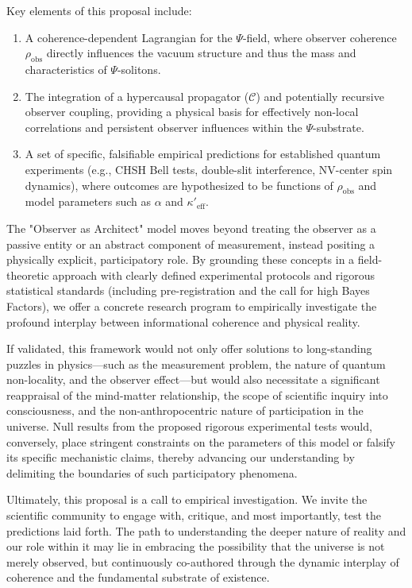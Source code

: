\documentclass[11pt, a4paper]{book}
\begin{document}
Key elements of this proposal include:
\begin{enumerate}
    \item A coherence-dependent Lagrangian for the $\Psi$-field, where observer coherence $\rho_{\text{obs}}$ directly influences the vacuum structure and thus the mass and characteristics of $\Psi$-solitons.
    \item The integration of a hypercausal propagator ($\mathcal{C}$) and potentially recursive observer coupling, providing a physical basis for effectively non-local correlations and persistent observer influences within the $\Psi$-substrate.
    \item A set of specific, falsifiable empirical predictions for established quantum experiments (e.g., CHSH Bell tests, double-slit interference, NV-center spin dynamics), where outcomes are hypothesized to be functions of $\rho_{\text{obs}}$ and model parameters such as $\alpha$ and $\kappa'_{\text{eff}}$.
\end{enumerate}
The "Observer as Architect" model moves beyond treating the observer as a passive entity or an abstract component of measurement, instead positing a physically explicit, participatory role. By grounding these concepts in a field-theoretic approach with clearly defined experimental protocols and rigorous statistical standards (including pre-registration and the call for high Bayes Factors), we offer a concrete research program to empirically investigate the profound interplay between informational coherence and physical reality.

If validated, this framework would not only offer solutions to long-standing puzzles in physics—such as the measurement problem, the nature of quantum non-locality, and the observer effect—but would also necessitate a significant reappraisal of the mind-matter relationship, the scope of scientific inquiry into consciousness, and the non-anthropocentric nature of participation in the universe. Null results from the proposed rigorous experimental tests would, conversely, place stringent constraints on the parameters of this model or falsify its specific mechanistic claims, thereby advancing our understanding by delimiting the boundaries of such participatory phenomena.

Ultimately, this proposal is a call to empirical investigation. We invite the scientific community to engage with, critique, and most importantly, test the predictions laid forth. The path to understanding the deeper nature of reality and our role within it may lie in embracing the possibility that the universe is not merely observed, but continuously co-authored through the dynamic interplay of coherence and the fundamental substrate of existence.
\end{document}
